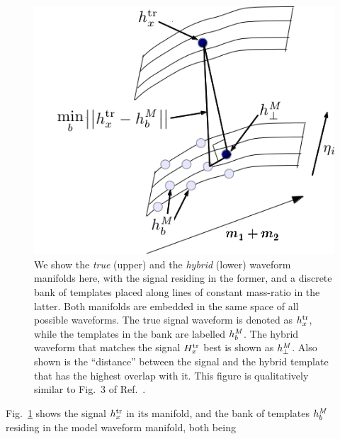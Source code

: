 \begin{figure}
 \centering
\includegraphics[width=\columnwidth]{Eff1v2.png}%
\caption{We show the \textit{true} (upper) and the \textit{hybrid} (lower) 
waveform manifolds here, with the signal residing in the former, and a discrete
bank of templates placed along lines of constant mass-ratio in the latter. 
Both manifolds are embedded in the same space of all possible waveforms.
The true signal waveform is denoted as $h^{\mathrm{tr}}_x$, while the templates in the
bank are labelled $h^{\mathit{M}}_b$. The hybrid waveform that matches the signal $H^{\mathrm{tr}}_x$
best is shown as $h^{\mathit{M}}_\perp$. Also shown is the ``distance'' between
the signal and the hybrid template that has the highest overlap with it.
This figure is qualitatively similar to Fig.~3 of
Ref.~\cite{WaveformAccuracy2008}.}
\label{fig:EFFdiag1}
\end{figure}
Fig.~\ref{fig:EFFdiag1} shows the signal $h^{\mathrm{tr}}_x$ in its manifold, and the
bank of templates $h^{\mathit{M}}_b$ residing in the model waveform manifold, both being

